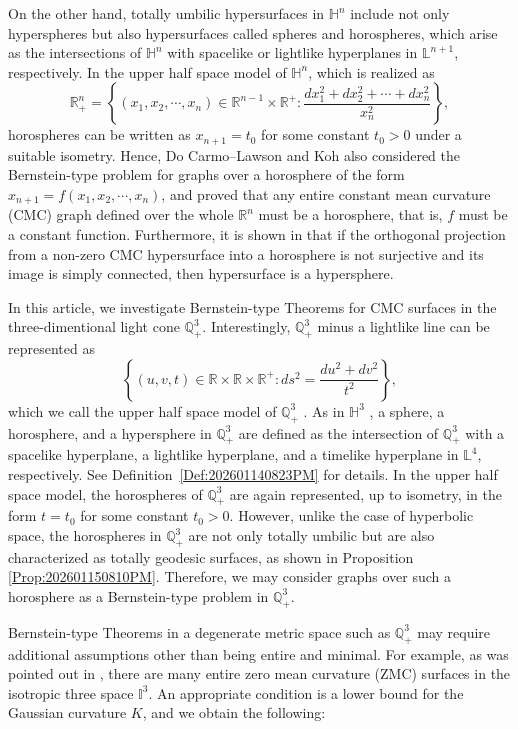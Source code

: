 \documentclass[12pt,reqno]{amsart}
\theoremstyle{plain} %
\theoremstyle{definition}
\numberwithin{equation}{section}
\newcommand{\hthree}{\mathbb{H}^3}
\newcommand{\qthreep}{\mathbb{Q}^3_+}
\newcommand{\lfour}{\mathbb{L}^4}
\newcommand{\ithree}{\mathbb{I}^3}
\begin{document}
On the other hand, totally umbilic hypersurfaces in $\mathbb{H}^n$ include not only hyperspheres but also hypersurfaces called spheres and horospheres, which arise as the intersections of $\mathbb{H}^n$ with spacelike or lightlike hyperplanes in $\mathbb{L}^{n+1}$, respectively.
In the upper half space model of $\mathbb{H}^n$, which is realized as
\[
	\mathbb{R}^n_+=\left \{(x_1,x_2, \cdots, x_n)\in \mathbb{R}^{n-1}\times \mathbb{R}^+\colon \frac{dx_1^2+dx_2^2+ \cdots + dx_{n}^2}{x_n^2}\right\},
\]
horospheres can be written as $x_{n+1}=t_0$ for some constant $t_0>0$ under a suitable isometry. Hence, Do Carmo--Lawson \cite{doCL} and Koh \cite{Koh} also considered the Bernstein-type problem for graphs over a horosphere of the form $x_{n+1}=f(x_1,x_2,\cdots,x_n)$, and proved that any entire constant mean curvature (CMC) graph defined over the whole $\mathbb{R}^n$ must be a horosphere, that is, $f$ must be a constant function. Furthermore, it is shown in \cite{Koh} that if the orthogonal projection from a non-zero CMC hypersurface into a horosphere is not surjective and its image is simply connected, then hypersurface is a hypersphere.

In this article, we investigate Bernstein-type Theorems for CMC surfaces in the three-dimentional light cone $\qthreep$.
Interestingly, $\qthreep$ minus a lightlike line can be represented as
$$
	\left\{ (u,v,t) \in \mathbb{R}\times\mathbb{R}\times \mathbb{R}^+ : ds^2= \frac{du^2+dv^2}{t^2}\right\},
$$
which we call the upper half space model of $\qthreep$ \cite{Cho}.
As in $\hthree$ \cite{doCL}, a sphere, a horosphere, and a hypersphere in $\qthreep$ are defined as the intersection of $\qthreep$ with a spacelike hyperplane, a lightlike hyperplane, and a timelike hyperplane in $\lfour$, respectively.
See Definition~\ref{Def:202601140823PM} for details.
In the upper half space model, the horospheres of $\qthreep$ are again represented, up to isometry, in the form $t=t_0$ for some constant $t_0>0$. However, unlike the case of hyperbolic space, the horospheres in $\qthreep$ are not only totally umbilic but are also characterized as totally geodesic surfaces, as shown in Proposition \ref{Prop:202601150810PM}. Therefore, we may consider graphs over such a horosphere as a Bernstein-type problem in $\qthreep$.


Bernstein-type Theorems in a degenerate metric space such as $\qthreep$ may require additional assumptions other than being  entire and minimal. For example, as was pointed out in \cite{ALY1}, there are many entire zero mean curvature (ZMC) surfaces in the isotropic three space $\ithree$. An appropriate condition is a lower bound for the Gaussian curvature $K$, and we obtain the following:
\end{document}
